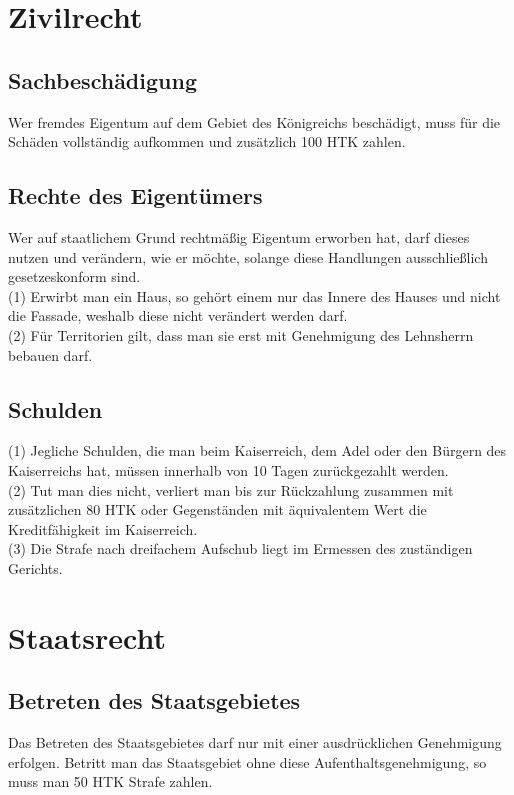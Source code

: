 \documentclass{article}
\begin{document}
\section{Zivilrecht}
\subsection{Sachbeschädigung}
Wer fremdes Eigentum auf dem Gebiet des Königreichs beschädigt, muss für die Schäden vollständig aufkommen und zusätzlich 100 HTK zahlen.

\subsection{Rechte des Eigentümers}
Wer auf staatlichem Grund rechtmäßig Eigentum erworben hat, darf dieses nutzen und verändern, wie er möchte, solange diese Handlungen ausschließlich gesetzeskonform sind.\\
(1) Erwirbt man ein Haus, so gehört einem nur das Innere des Hauses und nicht die Fassade, weshalb diese nicht verändert werden darf.\\
(2) Für Territorien gilt, dass man sie erst mit Genehmigung des Lehnsherrn bebauen darf.

\subsection{Schulden}\label{schulden}
(1) Jegliche Schulden, die man beim Kaiserreich, dem Adel oder den Bürgern des Kaiserreichs hat, müssen innerhalb von 10 Tagen zurückgezahlt werden.\\
(2) Tut man dies nicht, verliert man bis zur Rückzahlung zusammen mit zusätzlichen 80 HTK oder Gegenständen mit äquivalentem Wert die Kreditfähigkeit im Kaiserreich.\\
(3) Die Strafe nach dreifachem Aufschub liegt im Ermessen des zuständigen Gerichts.

\section{Staatsrecht}

\subsection{Betreten des Staatsgebietes}
Das Betreten des Staatsgebietes darf nur mit einer ausdrücklichen Genehmigung erfolgen. Betritt man das Staatsgebiet ohne diese Aufenthaltsgenehmigung, so muss man 50 HTK Strafe zahlen.
\end{document}
